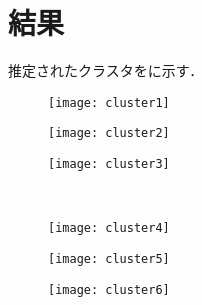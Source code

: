 \section{結果}
推定されたクラスタをに示す．

\begin{figure}[htbp]
    \begin{minipage}{0.32\hsize}
			\begin{center}
					\texttt{[image: cluster1]}
			\end{center}
		\end{minipage}
    \begin{minipage}{0.32\hsize}
			\begin{center}
					\texttt{[image: cluster2]}
			\end{center}
		\end{minipage}
    \begin{minipage}{0.32\hsize}
			\begin{center}
					\texttt{[image: cluster3]}
			\end{center}
		\end{minipage}\\
    \begin{minipage}{0.32\hsize}
			\begin{center}
					\texttt{[image: cluster4]}
			\end{center}
		\end{minipage}
    \begin{minipage}{0.32\hsize}
			\begin{center}
					\texttt{[image: cluster5]}
			\end{center}
		\end{minipage}
    \begin{minipage}{0.32\hsize}
			\begin{center}
					\texttt{[image: cluster6]}
			\end{center}
		\end{minipage}
		\label{fig:real-clst}
\end{figure}
